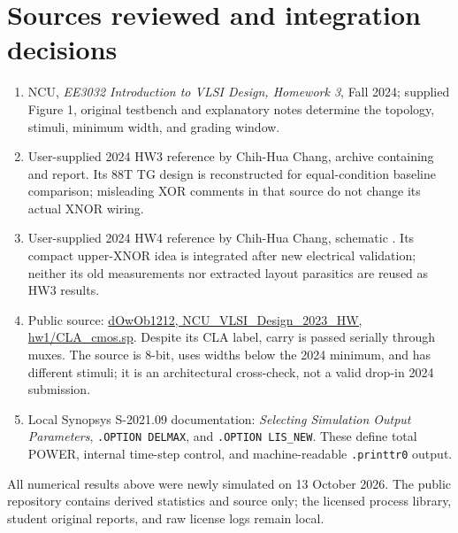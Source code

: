 \documentclass[11pt,a4paper]{article}
\begin{document}
\section*{Sources reviewed and integration decisions}
\begin{enumerate}
\item NCU, \emph{EE3032 Introduction to VLSI Design,
Homework 3}, Fall 2024; supplied Figure 1, original testbench and explanatory
notes determine the topology, stimuli, minimum width, and grading window.
\item User-supplied 2024 HW3 reference by Chih-Hua Chang, archive containing
 and report. Its 88T TG design is
reconstructed for equal-condition baseline comparison; misleading XOR
comments in that source do not change its actual XNOR wiring.
\item User-supplied 2024 HW4 reference by Chih-Hua Chang, schematic
. Its compact upper-XNOR idea is
integrated after new electrical validation; neither its old measurements
nor extracted layout parasitics are reused as HW3 results.
\item Public source: \href{https://github.com/dOwOb1212/NCU_VLSI_Design_2023_HW/blob/main/hw1/CLA_cmos.sp}{dOwOb1212, NCU\_VLSI\_Design\_2023\_HW, hw1/CLA\_cmos.sp}.
Despite its CLA label, carry is passed serially through muxes. The source
is 8-bit, uses widths below the 2024 minimum, and has different stimuli;
it is an architectural cross-check, not a valid drop-in 2024 submission.
\item Local Synopsys S-2021.09 documentation: \emph{Selecting Simulation
Output Parameters}, \texttt{.OPTION DELMAX}, and \texttt{.OPTION LIS\_NEW}.
These define total POWER, internal time-step control, and machine-readable
\texttt{.printtr0} output.
\end{enumerate}
All numerical results above were newly simulated on 13 October 2026.
The public repository contains derived statistics and source only; the
licensed process library, student original reports, and raw license logs
remain local.
\end{document}
